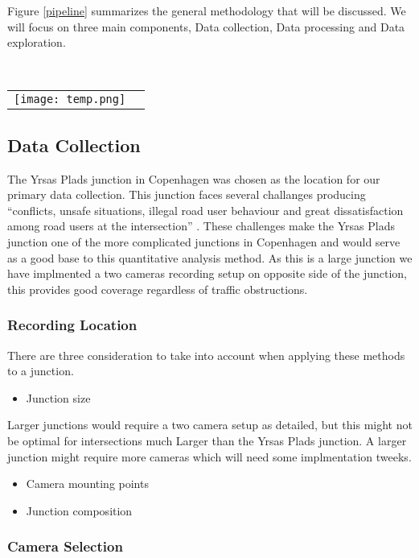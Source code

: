 
Figure \ref{pipeline} summarizes the general methodology that will be discussed. We will focus
on three main components, Data collection, Data processing and Data exploration.

\ \\ 
\noindent
\begin{tabular}{@{}cc}
\texttt{[image: temp.png]} 
\end{tabular}
\label{pipeline}

\subsection{Data Collection}

The Yrsas Plads junction in Copenhagen was chosen as the location for our primary data collection. 
This junction faces several challanges producing “conflicts, unsafe situations, illegal road user behaviour and great dissatisfaction among road users at the intersection” \cite{CPHpost_2021}.
These challenges make the Yrsas Plads junction one of the more complicated junctions in Copenhagen and would serve as a good base to this quantitative analysis method. 
As this is a large junction we have implmented a two cameras recording setup on opposite side of the junction, this provides good coverage regardless of traffic obstructions.

\subsubsection{Recording Location}

There are three consideration to take into account when applying these methods to a junction.
\begin{itemize}
	\item Junction size
\end{itemize}
Larger junctions would require a two camera setup as detailed, but this might not be optimal for intersections much Larger
than the Yrsas Plads junction. A larger junction might require more cameras which will need some implmentation tweeks.
\begin{itemize}
	\item Camera mounting points
\end{itemize}
\begin{itemize}
	\item Junction composition
\end{itemize}

\subsubsection{Camera Selection}

